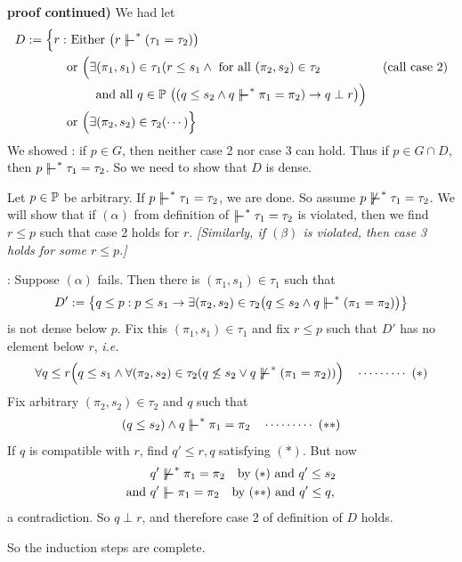 \documentclass[12pt,a4paper]{article}
\newenvironment{proof}
{\begin{changemargin}{0.5cm}{0.5cm} 
	}%
	{\end{changemargin}
}
\newenvironment{subproof}
{\begin{changemargin}{0.5cm}{0.5cm} 
	}%
	{\end{changemargin}
}
\newenvironment{p}
{\begin{proof} 
	}%
	{\end{proof}
}
\begin{document}
\begin{p}
\textbf{proof continued)} We had let
\begin{align*}
D:= \Big\{r: & \text{ Either } \big(r\forces^* (\tau_1 = \tau_2) \big) \\
& \text{or } \Big(\exists (\pi_1, s_1) \in \tau_1 (r\leq s_1 \wedge \text{ for all } (\pi_2, s_2) \in \tau_2 \quad\quad\quad\quad\quad \text{(call case 2)}\\
& \quad \quad \text{ and all } q \in \poset \,\, \big( (q\leq s_2 \wedge q\forces^* \pi_1= \pi_2) \rightarrow q\perp r \big) \Big) \\
& \text{or } \Big( \exists (\pi_2, s_2)\in \tau_2 (\cdots) \Big\}
\end{align*}
We showed : if $p\in G$, then neither case 2 nor case 3 can hold. Thus if $p\in G\cap D$, then $p\forces^* \tau_1 = \tau_2$. So we need to show that $D$ is dense.

\quad Let $p\in \mathbb{P}$ be arbitrary. If $p\forces^* \tau_1 =\tau_2$, we are done. So assume $p\not\forces^* \tau_1 =\tau_2$. We will show that if $(\alpha)$ from definition of $\forces^* \tau_1 =\tau_2$ is violated, then we find $r\leq p$ such that case 2 holds for $r$. \emph{[Similarly, if $(\beta)$ is violated, then case 3 holds for some $r\leq p$.]}
\begin{subproof}
: Suppose $(\alpha)$ fails. Then there is $(\pi_1, s_1) \in \tau_1$ such that
\begin{align*}
D' := \big\{ q\leq p : p\leq s_1 \rightarrow \exists (\pi_2, s_2) \in \tau_2 \big(q\leq s_2 \wedge q\forces^* (\pi_1 =\pi_2) \big)\big\}
\end{align*}
is not dense below $p$. Fix this $(\pi_1, s_1) \in \tau_1$ and fix $r\leq p$ such that $D'$ has no element below $r$, \textit{i.e.}
\begin{align*}
\forall q\leq r \Big( q\leq s_1 \wedge \forall(\pi_2, s_2)\in \tau_2 (q\not\leq s_2 \vee q\not\forces^* (\pi_1 =\pi_2)) \Big) \call{*}
\end{align*}
Fix arbitrary $(\pi_2, s_2) \in \tau_2$ and $q$ such that 
\begin{align*}
(q\leq s_2) \wedge q\forces^* \pi_1 =\pi_2 \call{**}
\end{align*}
If $q$ is compatible with $r$, find $q'\leq r, q$ satisfying $(*)$. But now
\begin{align*}
& q' \not\forces^* \pi_1 =\pi_2 \quad \text{by } (*) \text{ and } q' \leq s_2 \\
\text{and } & q'\forces \pi_1 =\pi_2 \quad \text{by } (**) \text{ and } q'\leq q,
\end{align*}
a contradiction. So $q\perp r$, and therefore case 2 of definition of $D$ holds.
\end{subproof} 
So the induction steps are complete.

\eop
\end{p}
\s
\end{document}
